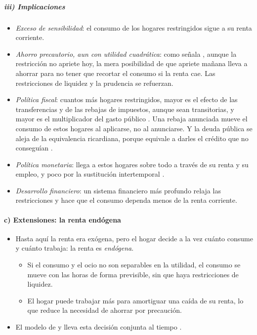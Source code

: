 \documentclass[11pt]{article}
\begin{document}
\subparagraph{iii) Implicaciones}

\begin{itemize}
\item \emph{Exceso de sensibilidad}: el consumo de los hogares restringidos sigue a su renta corriente.
\item \emph{Ahorro precautorio, aun con utilidad cuadrática}: como señala \textcite{Zeldes1989Optimal}, aunque la restricción no apriete hoy, la mera posibilidad de que apriete mañana lleva a ahorrar para no tener que recortar el consumo si la renta cae. Las restricciones de liquidez y la prudencia se refuerzan\nocite{Deaton1991Saving,Carroll1997Buffer}.
\item \emph{Política fiscal}: cuantos más hogares restringidos, mayor es el efecto de las transferencias y de las rebajas de impuestos, aunque sean transitorias, y mayor es el multiplicador del gasto público\nocite{GaliLopezSalidoValles2007} . Una rebaja anunciada mueve el consumo de estos hogares al aplicarse, no al anunciarse. Y la deuda pública se aleja de la equivalencia ricardiana, porque equivale a darles el crédito que no conseguían .
\item \emph{Política monetaria}: llega a estos hogares sobre todo a través de su renta y su empleo, y poco por la sustitución intertemporal\nocite{KaplanMollViolante2018Monetary} .
\item \emph{Desarrollo financiero}: un sistema financiero más profundo relaja las restricciones y hace que el consumo dependa menos de la renta corriente.
\end{itemize}

\paragraph{c) Extensiones: la renta endógena}

\begin{itemize}
\item Hasta aquí la renta era exógena, pero el hogar decide a la vez cuánto consume y cuánto trabaja: la renta es \emph{endógena}.
  \begin{itemize}
  \item Si el consumo y el ocio no son separables en la utilidad, el consumo se mueve con las horas de forma previsible, sin que haya restricciones de liquidez.
  \item El hogar puede trabajar más para amortiguar una caída de su renta, lo que reduce la necesidad de ahorrar por precaución.
  \end{itemize}
\item El modelo de  y  lleva esta decisión conjunta al tiempo\nocite{LucasRapping1969Real} .
\end{itemize}
\end{document}
